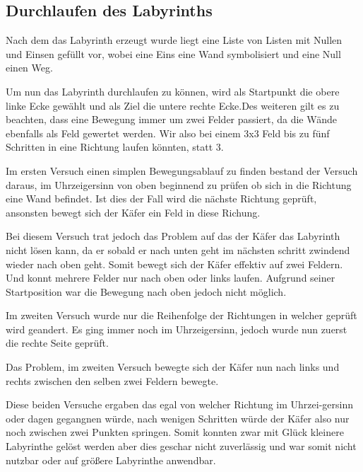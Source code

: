 \documentclass[11pt, a4paper]{article}
\begin{document}
\subsection{Durchlaufen des Labyrinths}

Nach dem das Labyrinth erzeugt wurde liegt eine Liste von Listen mit Nullen und Einsen gefüllt vor, wobei eine Eins eine Wand symbolisiert und eine Null einen Weg. 

\bigskip

Um nun das Labyrinth durchlaufen zu können, wird als Startpunkt die obere linke Ecke gewählt und als Ziel die untere rechte Ecke.Des weiteren gilt es zu beachten, dass eine Bewegung immer um zwei Felder passiert, da die Wände ebenfalls als Feld gewertet werden. Wir also bei einem 3x3 Feld bis zu fünf Schritten in eine Richtung laufen könnten, statt 3.

\bigskip

Im ersten Versuch einen simplen Bewegungsablauf zu finden bestand der Versuch daraus, im Uhrzeigersinn von oben beginnend zu prüfen ob sich in die Richtung eine Wand befindet. Ist dies der Fall wird die nächste Richtung geprüft, ansonsten bewegt sich der Käfer ein Feld in diese Richung. 

Bei diesem Versuch trat jedoch das Problem auf das der Käfer das Labyrinth nicht lösen kann, da er sobald er nach unten geht im nächsten schritt zwindend wieder nach oben geht. Somit bewegt sich der Käfer effektiv auf zwei Feldern. Und konnt mehrere Felder nur nach oben oder links laufen. Aufgrund seiner Startposition war die Bewegung nach oben jedoch nicht möglich.

\bigskip

Im zweiten Versuch wurde nur die Reihenfolge der Richtungen in welcher geprüft wird geandert. Es ging immer noch im Uhrzeigersinn, jedoch wurde nun zuerst die rechte Seite geprüft.

Das Problem, im zweiten Versuch bewegte sich der Käfer nun nach links und rechts zwischen den selben zwei Feldern bewegte. 

\bigskip

Diese beiden Versuche ergaben das egal von welcher Richtung im Uhrzei-gersinn oder dagen gegangnen würde, nach wenigen Schritten würde der Käfer also nur noch zwischen zwei Punkten springen. Somit konnten zwar mit Glück kleinere Labyrinthe gelöst werden aber dies geschar nicht zuverlässig und war somit nicht nutzbar oder auf größere Labyrinthe anwendbar.

\bigskip
\end{document}
